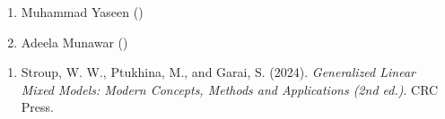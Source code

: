 \documentclass[a4paper]{book}
\begin{document}
%
\begin{Author}
\begin{enumerate}

\item{} Muhammad Yaseen ()
\item{} Adeela Munawar ()

\end{enumerate}

\end{Author}
%
\begin{References}
\begin{enumerate}

\item{} Stroup, W. W., Ptukhina, M., and Garai, S. (2024).
\emph{Generalized Linear Mixed Models: Modern Concepts, Methods and Applications (2nd ed.)}.
CRC Press.

\end{enumerate}

\end{References}
%
\begin{SeeAlso}
\end{SeeAlso}
%
\end{document}

